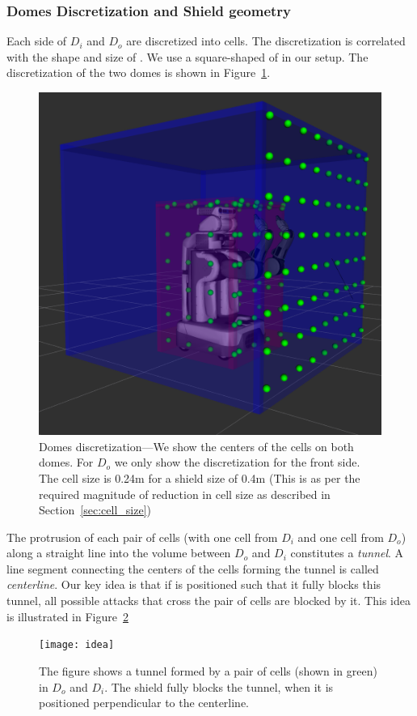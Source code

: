 \documentclass[a4paper]{report}
\begin{document}
\subsubsection{Domes Discretization and Shield geometry}
Each side of $D_i$ and $D_o$ are discretized into cells. The discretization is correlated with the shape and size of \calS. We use a square-shaped \calS of in our setup. The discretization of the two domes is shown in Figure~\ref{fig:domes_disc}.
%

\begin{figure}[ht]
\centering
 \includegraphics[width=0.8\columnwidth]{domes_disc}
\caption{Domes discretization---We show the centers of the cells on both domes. For $D_o$ we only show the discretization for the front side. The cell size is 0.24m for a shield size of 0.4m (This is as per the required magnitude of reduction in cell size as described in Section~\ref{sec:cell_size})}
\label{fig:domes_disc}
\end{figure}

The protrusion of each pair of cells (with one cell from $D_i$ and one cell from $D_o$) along a straight line into the volume between $D_o$ and $D_i$ constitutes a \emph{tunnel}. A line segment connecting the centers of the cells forming the tunnel is called \emph{centerline}. Our key idea is that if \calS is positioned such that it fully blocks this tunnel, all possible attacks that cross the pair of cells are blocked by it. This idea is illustrated in Figure~\ref{fig:shield_idea}

\begin{figure}[ht]
\centering
 \texttt{[image: idea]}
\caption{The figure shows a tunnel formed by a pair of cells (shown in green) in $D_o$ and $D_i$. The shield fully blocks the tunnel, when it is positioned perpendicular to the centerline.}
\label{fig:shield_idea}
\end{figure}
\end{document}
